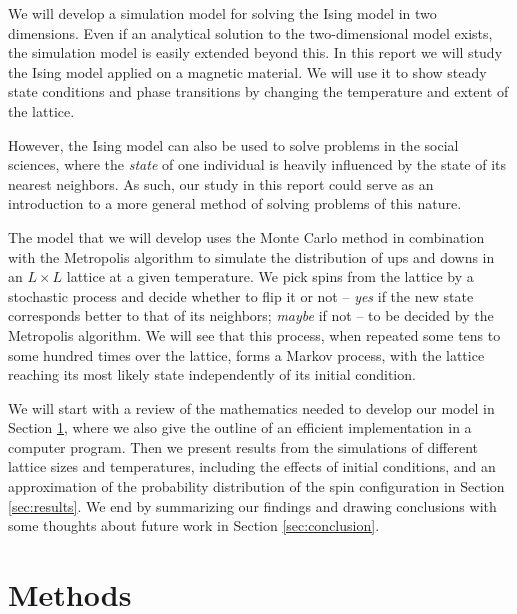 \documentclass[]{article}
\begin{document}
We will develop a simulation model for solving the Ising model in two dimensions. Even if an analytical solution to the two-dimensional model exists, the simulation model is easily extended beyond this. In this report we will study the Ising model applied on a magnetic material. We will use it to show steady state conditions and phase transitions by changing the temperature and extent of the lattice. 

However, the Ising model can also be used to solve problems in the social sciences, where the \textit{state} of one individual is heavily influenced by the state of its nearest neighbors. As such, our study in this report could serve as an introduction to a more general method of solving problems of this nature.

The model that we will develop uses the Monte Carlo method in combination with the Metropolis algorithm to simulate the distribution of ups and downs in an $L \times L$ lattice at a given temperature. We pick spins from the lattice by a stochastic process and decide whether to flip it or not -- \textit{yes} if the new state corresponds better to that of its neighbors; \textit{maybe} if not -- to be decided by the Metropolis algorithm. We will see that this process, when repeated some tens to some hundred times over the lattice, forms a Markov process, with the lattice reaching its most likely state independently of its initial condition.

We will start with a review of the mathematics needed to develop our model in Section \ref{sec:methods}, where we also give the outline of an efficient implementation in a computer program. Then we present results from the simulations of different lattice sizes and temperatures, including the effects of initial conditions, and an approximation of the probability distribution of the spin configuration in Section \ref{sec:results}. We end by summarizing our findings and drawing conclusions with some thoughts about future work in Section \ref{sec:conclusion}.



\section{Methods} \label{sec:methods}
\end{document}
